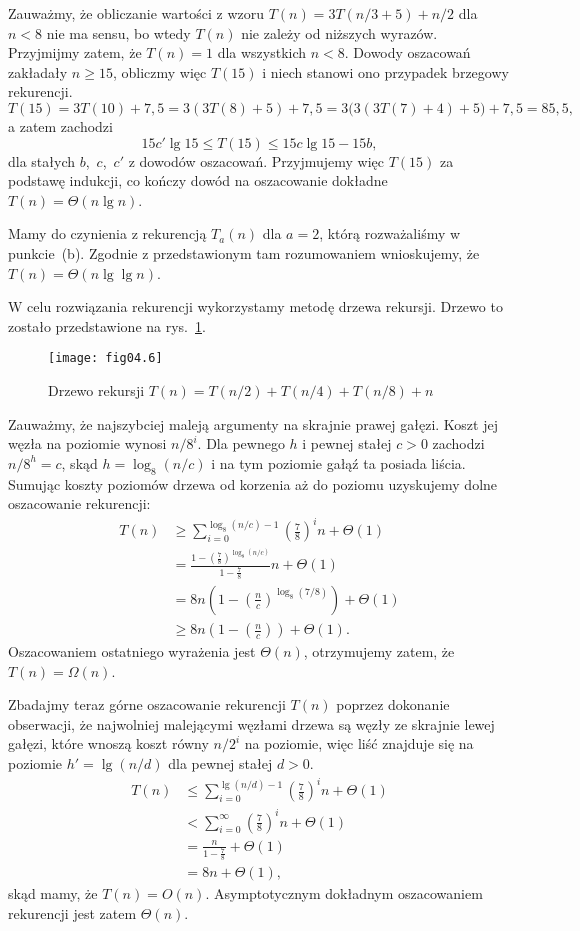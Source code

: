 Zauważmy, że obliczanie wartości z wzoru $T(n)=3T(n/3+5)+n/2$ dla $n<8$ nie ma sensu, bo wtedy $T(n)$ nie zależy od niższych wyrazów. Przyjmijmy zatem, że $T(n)=1$ dla wszystkich $n<8$. Dowody oszacowań zakładały $n\ge15$, obliczmy więc $T(15)$ i niech stanowi ono przypadek brzegowy rekurencji.
\[
	T(15) = 3T(10)+7{,}5 = 3(3T(8)+5)+7{,}5 = 3\bigl(3(3T(7)+4)+5\bigr)+7{,}5 = 85{,}5,
\]
a zatem zachodzi
\[
	15c'\lg15 \le T(15) \le 15c\lg15-15b,
\]
dla stałych $b$,~$c$,~$c'$ z dowodów oszacowań. Przyjmujemy więc $T(15)$ za podstawę indukcji, co kończy dowód na oszacowanie dokładne $T(n)=\Theta(n\lg n)$.

\subexercise{} %
Mamy do czynienia z rekurencją $T_a(n)$ dla $a=2$, którą rozważaliśmy w punkcie~(b). Zgodnie z przedstawionym tam rozumowaniem wnioskujemy, że $T(n)=\Theta(n\lg\lg n)$.

\subexercise{} %
W celu rozwiązania rekurencji wykorzystamy metodę drzewa rekursji. Drzewo to zostało przedstawione na rys.~\ref{fig:4-4f}.
\begin{figure}[ht]
	\begin{center}
		\texttt{[image: fig04.6]}
	\end{center}
	\caption{Drzewo rekursji $T(n)=T(n/2)+T(n/4)+T(n/8)+n$} \label{fig:4-4f}
\end{figure}

Zauważmy, że najszybciej maleją argumenty na skrajnie prawej gałęzi. Koszt jej węzła na  poziomie wynosi $n/8^i$. Dla pewnego $h$ i pewnej stałej $c>0$ zachodzi $n/8^h=c$, skąd $h=\log_8(n/c)$ i na tym poziomie gałąź ta posiada liścia. Sumując koszty poziomów drzewa od korzenia aż do  poziomu uzyskujemy dolne oszacowanie rekurencji:
\begin{align*}
	T(n) &\ge \sum_{i=0}^{\log_8(n/c)-1}\left(\frac{7}{8}\right)^in+\Theta(1) \\
	&= \frac{1-\left(\frac{7}{8}\right)^{\log_8(n/c)}}{1-\frac{7}{8}}n+\Theta(1) \\
	&= 8n\left(1-\left(\frac{n}{c}\right)^{\log_8(7/8)}\right)+\Theta(1) \\
	&\ge 8n\left(1-\left(\frac{n}{c}\right)\right)+\Theta(1).
\end{align*}
Oszacowaniem ostatniego wyrażenia jest $\Theta(n)$, otrzymujemy zatem, że $T(n)=\Omega(n)$.

Zbadajmy teraz górne oszacowanie rekurencji $T(n)$ poprzez dokonanie obserwacji, że najwolniej malejącymi węzłami drzewa są węzły ze skrajnie lewej gałęzi, które wnoszą koszt równy $n/2^i$ na  poziomie, więc liść znajduje się na poziomie $h'=\lg(n/d)$ dla pewnej stałej $d>0$.
\begin{align*}
	T(n) &\le \sum_{i=0}^{\lg(n/d)-1}\left(\frac{7}{8}\right)^in+\Theta(1) \\
	&< \sum_{i=0}^\infty\left(\frac{7}{8}\right)^in+\Theta(1) \\
	&= \frac{n}{1-\frac{7}{8}}+\Theta(1) \\
	&= 8n+\Theta(1),
\end{align*}
skąd mamy, że $T(n)=O(n)$. Asymptotycznym dokładnym oszacowaniem rekurencji jest zatem $\Theta(n)$.

